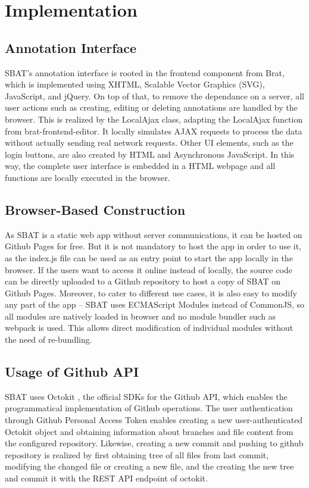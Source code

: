 \documentclass[12ptm a4paper]{article}
\begin{document}
\section{Implementation}
\subsection{Annotation Interface}
SBAT's annotation interface is rooted in the frontend component from Brat, which is implemented using XHTML, Scalable Vector Graphics (SVG), JavaScript, and jQuery. On top of that, to remove the dependance on a server, all user actions such as creating, editing or deleting annotations are handled by the browser. This is realized by the LocalAjax class, adapting the LocalAjax function from brat-frontend-editor. It locally simulates AJAX requests to process the data without actually sending real network requests. Other UI elements, such as the login buttons, are also created by HTML and Asynchronous JavaScript. In this way, the complete user interface is embedded in a HTML webpage and all functions are locally executed in the browser.
\subsection{Browser-Based Construction}
As SBAT is a static web app without server communications, it can be hosted on Github Pages for free. But it is not mandatory to host the app in order to use it, as the index.js file can be used as an entry point to start the app locally in the browser. If the users want to access it online instead of locally, the source code can be directly uploaded to a Github repository to host a copy of SBAT on Github Pages. Moreover, to cater to different use cases, it is also easy to modify any part of the app -- SBAT uses ECMAScript Modules instead of CommonJS, so all modules are natively loaded in browser and no module bundler such as webpack is used. This allows direct modification of individual modules without the need of re-bundling.
\subsection{Usage of Github API}
SBAT uses Octokit \cite{octokit.js}, the official SDKs for the Github API, which enables the programmatical implementation of Github operations. The user authentication through Github Personal Access Token enables creating a new user-authenticated Octokit object and obtaining information about branches and file content from the configured repository. Likewise, creating a new commit and pushing to github repository is realized by first obtaining tree of all files from last commit, modifying the changed file or creating a new file, and the creating the new tree and commit it with the REST API endpoint of octokit.
\end{document}
